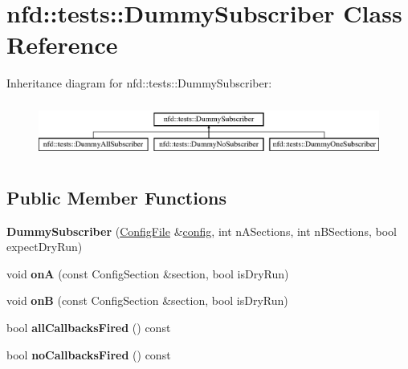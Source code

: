 \hypertarget{classnfd_1_1tests_1_1DummySubscriber}{}\section{nfd\+:\+:tests\+:\+:Dummy\+Subscriber Class Reference}
\label{classnfd_1_1tests_1_1DummySubscriber}
Inheritance diagram for nfd\+:\+:tests\+:\+:Dummy\+Subscriber\+:\begin{figure}[H]
\begin{center}
\leavevmode
\includegraphics[height=1.848185cm]{classnfd_1_1tests_1_1DummySubscriber}
\end{center}
\end{figure}
\subsection*{Public Member Functions}
\begin{DoxyCompactItemize}
\item 
{\bfseries Dummy\+Subscriber} (\hyperlink{classnfd_1_1ConfigFile}{Config\+File} \&\hyperlink{classconfig}{config}, int n\+A\+Sections, int n\+B\+Sections, bool expect\+Dry\+Run)\hypertarget{classnfd_1_1tests_1_1DummySubscriber_aa50647381446d96cd35197530fbb323b}{}\label{classnfd_1_1tests_1_1DummySubscriber_aa50647381446d96cd35197530fbb323b}

\item 
void {\bfseries onA} (const Config\+Section \&section, bool is\+Dry\+Run)\hypertarget{classnfd_1_1tests_1_1DummySubscriber_a6e55319e2a1710007481f17de293e340}{}\label{classnfd_1_1tests_1_1DummySubscriber_a6e55319e2a1710007481f17de293e340}

\item 
void {\bfseries onB} (const Config\+Section \&section, bool is\+Dry\+Run)\hypertarget{classnfd_1_1tests_1_1DummySubscriber_a8ebf16ebc085acbe3a0572ec0914cd12}{}\label{classnfd_1_1tests_1_1DummySubscriber_a8ebf16ebc085acbe3a0572ec0914cd12}

\item 
bool {\bfseries all\+Callbacks\+Fired} () const\hypertarget{classnfd_1_1tests_1_1DummySubscriber_ac59c62d76f0ad91879a9eda09e4ac739}{}\label{classnfd_1_1tests_1_1DummySubscriber_ac59c62d76f0ad91879a9eda09e4ac739}

\item 
bool {\bfseries no\+Callbacks\+Fired} () const\hypertarget{classnfd_1_1tests_1_1DummySubscriber_a2877877ed32ec701c3ed03b0f22aaae7}{}\label{classnfd_1_1tests_1_1DummySubscriber_a2877877ed32ec701c3ed03b0f22aaae7}

\end{DoxyCompactItemize}


